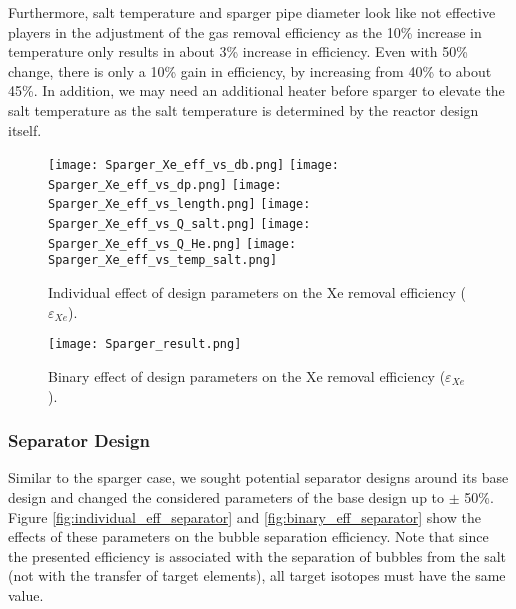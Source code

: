     Furthermore, salt temperature and sparger pipe diameter look like not 
    effective players in the adjustment of the gas removal efficiency as the 
    10\% increase in temperature only results in about 3\% increase in 
    efficiency. Even with 50\% change, there is only a 10\% gain in efficiency, 
    by increasing from 40\% to about 45\%. In addition, we may need an 
    additional heater before sparger to elevate the salt temperature as the 
    salt temperature is determined by the reactor design itself.

    \begin{figure}[htbp!]
        \begin{center}
            \texttt{[image: Sparger\_Xe\_eff\_vs\_db.png]}
            \texttt{[image: Sparger\_Xe\_eff\_vs\_dp.png]}
            \texttt{[image: Sparger\_Xe\_eff\_vs\_length.png]}
            \texttt{[image: Sparger\_Xe\_eff\_vs\_Q\_salt.png]}
            \texttt{[image: Sparger\_Xe\_eff\_vs\_Q\_He.png]}
            \texttt{[image: Sparger\_Xe\_eff\_vs\_temp\_salt.png]}
        \end{center}
        \caption{Individual effect of design parameters on the Xe removal 
            efficiency ($\varepsilon$$_{Xe}$).}
        \label{fig:individual_eff_sparger}
    \end{figure}

    \begin{figure}[htbp!]
        \begin{center}
            \texttt{[image: Sparger\_result.png]}
        \end{center}
        \caption{Binary effect of design parameters on the Xe removal 
            efficiency ($\varepsilon$$_{Xe}$).}
        \label{fig:binary_eff_sparger}
    \end{figure}

\newpage
\FloatBarrier

\subsubsection{Separator Design}

    Similar to the sparger case, we sought potential separator designs around 
    its base design and changed the considered parameters of the base design up 
    to $\pm$ 50\%. Figure \ref{fig:individual_eff_separator} and 
    \ref{fig:binary_eff_separator} show the effects of these parameters on the 
    bubble separation efficiency. Note that since the presented efficiency is 
    associated with the separation of bubbles from the salt (not with the 
    transfer of target elements), all target isotopes must have the same value.

